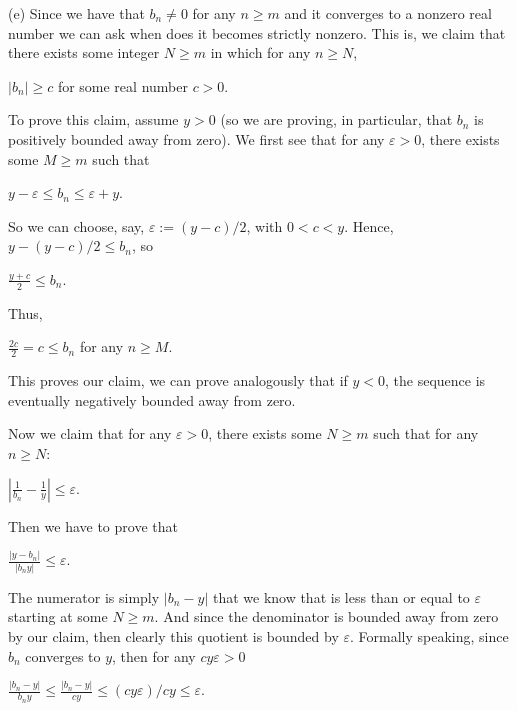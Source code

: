 \documentclass{article}
\newcommand{\abs}[1]{\left|#1\right|}
\theoremstyle{remark}
\begin{document}
\begin{enumerate}
            (e)
            Since we have that $b_n \neq 0$ for any $n \geq m$ and it converges to a nonzero real number
            we can ask when does it becomes strictly nonzero. This is, we claim that there exists some integer $N \geq m$ in which 
            for any $n \geq N$,
            \begin{center}
                $\displaystyle \vert b_n \vert \geq c$ for some real number $c > 0$.
            \end{center}
            To prove this claim, assume $y > 0$ (so we are proving, in particular, that $b_n$ is positively bounded away from zero). 
            We first see that for any $\varepsilon >0$, there exists some $M \geq m$ such that
            \begin{center}
                $\displaystyle y - \varepsilon \leq b_n \leq \varepsilon + y$.
            \end{center}
            So we can choose, say, $\varepsilon := (y-c)/2$, with $0 < c < y$. Hence, $y - (y-c)/2 \leq b_n$,
            so
            \begin{center}
                $\displaystyle \frac{y + c}{2} \leq b_n$.
            \end{center}
            Thus,
            \begin{center}
                $\displaystyle \frac{2c}{2} = c \leq b_n$ for any $n \geq M$.
            \end{center}
            This proves our claim, we can prove analogously that if $y < 0$, the sequence is eventually negatively bounded away from zero.
        
            Now we claim that for any $\varepsilon > 0$, there exists some $N \geq m$ such that for any $n \geq N$:
            \begin{center}
                $\displaystyle \abs{\frac{1}{b_n} - \frac{1}{y}} \leq {\varepsilon}$.
            \end{center}
            Then we have to prove that
            \begin{center}
                $\displaystyle \frac{\vert y-b_n\vert}{\vert b_ny\vert } \leq \varepsilon$.
            \end{center}
            The numerator is simply $\vert b_n - y\vert$ that we know that is less than or equal to $\varepsilon$ starting at some $N \geq m$.
            And since the denominator is bounded away from zero by our claim, then clearly this quotient is bounded by $\varepsilon$. 
            Formally speaking, since $b_n$ converges to $y$, then for any $cy\varepsilon > 0$
            \begin{center}
                $\displaystyle \frac{\vert b_n - y \vert}{b_ny} \leq \frac{\vert b_n - y \vert}{cy} \leq (cy\varepsilon)/cy \leq \varepsilon$.
            \end{center}


\end{enumerate}
\end{document}
